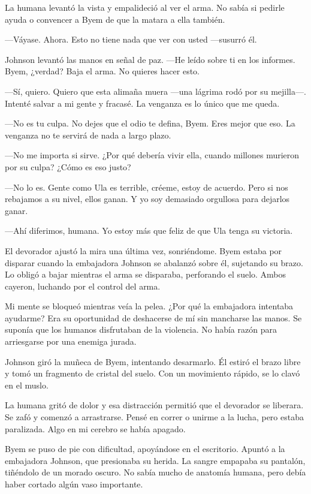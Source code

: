 La humana levantó la vista y empalideció al ver el arma. No sabía si pedirle ayuda o convencer a Byem de que la matara a ella también.

—Váyase. Ahora. Esto no tiene nada que ver con usted —susurró él.

Johnson levantó las manos en señal de paz. —He leído sobre ti en los informes. Byem, ¿verdad? Baja el arma. No quieres hacer esto.

—Sí, quiero. Quiero que esta alimaña muera —una lágrima rodó por su mejilla—. Intenté salvar a mi gente y fracasé. La venganza es lo único que me queda.

—No es tu culpa. No dejes que el odio te defina, Byem. Eres mejor que eso. La venganza no te servirá de nada a largo plazo.

—No me importa si sirve. ¿Por qué debería vivir ella, cuando millones murieron por su culpa? ¿Cómo es eso justo?

—No lo es. Gente como Ula es terrible, créeme, estoy de acuerdo. Pero si nos rebajamos a su nivel, ellos ganan. Y yo soy demasiado orgullosa para dejarlos ganar.

—Ahí diferimos, humana. Yo estoy más que feliz de que Ula tenga su victoria.

El devorador ajustó la mira una última vez, sonriéndome. Byem estaba por disparar cuando la embajadora Johnson se abalanzó sobre él, sujetando su brazo. Lo obligó a bajar mientras el arma se disparaba, perforando el suelo. Ambos cayeron, luchando por el control del arma.

Mi mente se bloqueó mientras veía la pelea. ¿Por qué la embajadora intentaba ayudarme? Era su oportunidad de deshacerse de mí sin mancharse las manos. Se suponía que los humanos disfrutaban de la violencia. No había razón para arriesgarse por una enemiga jurada.

Johnson giró la muñeca de Byem, intentando desarmarlo. Él estiró el brazo libre y tomó un fragmento de cristal del suelo. Con un movimiento rápido, se lo clavó en el muslo.

La humana gritó de dolor y esa distracción permitió que el devorador se liberara. Se zafó y comenzó a arrastrarse. Pensé en correr o unirme a la lucha, pero estaba paralizada. Algo en mi cerebro se había apagado.

Byem se puso de pie con dificultad, apoyándose en el escritorio. Apuntó a la embajadora Johnson, que presionaba su herida. La sangre empapaba su pantalón, tiñéndolo de un morado oscuro. No sabía mucho de anatomía humana, pero debía haber cortado algún vaso importante.

